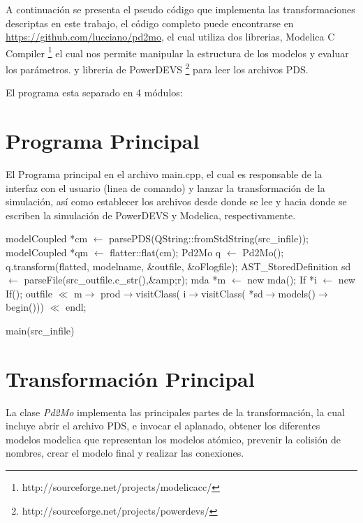 	A continuación se presenta el pseudo código que implementa las transformaciones descriptas en este trabajo, 
	el código completo puede encontrarse en \url{https://github.com/lucciano/pd2mo}, el cual utiliza dos librerias, Modelica C Compiler 
	\footnote{http://sourceforge.net/projects/modelicacc/} el cual nos permite manipular la estructura de los modelos y evaluar los parámetros.
	y libreria de PowerDEVS \footnote{http://sourceforge.net/projects/powerdevs/} para leer los archivos PDS.

El programa esta separado en 4 módulos:


\section{Programa Principal}

El Programa principal en el archivo main.cpp, el cual es responsable de la interfaz con el usuario (linea de comando) y lanzar la transformación de la simulación, así como establecer los archivos desde donde se lee y hacia donde se escriben la simulación de PowerDEVS y Modelica, respectivamente.


\begin{algorithm}[H]
\begin{algorithmic}[1]
\State modelCoupled *cm $\gets$ parsePDS(QString::fromStdString(src\_infile));
\State modelCoupled *qm $\gets$ flatter::flat(cm);
\State Pd2Mo q $\gets$ Pd2Mo();
\State q.transform(flatted, modelname, \&outfile, \&oFlogfile);
\State AST\_StoredDefinition sd $\gets$ parseFile(src\_outfile.c\_str(),\&amp;r);
\State mda *m $\gets$ new mda();
\State If *i $\gets$ new If();
\State outfile $\ll$ m$\rightarrow$ 
		{prod$\rightarrow$visitClass( i$\rightarrow$visitClass( 
			*sd$\rightarrow$models()$\rightarrow$begin()))} $\ll$ endl;

\end{algorithmic}
\caption{main(src\_infile)}
\end{algorithm}

\section{Transformación Principal}
La clase \emph{Pd2Mo} implementa las principales partes de la transformación, la cual incluye abrir el archivo PDS, e invocar el aplanado, obtener los diferentes modelos modelica que representan los modelos atómico, prevenir la colisión de nombres, crear el modelo final y realizar las conexiones.

